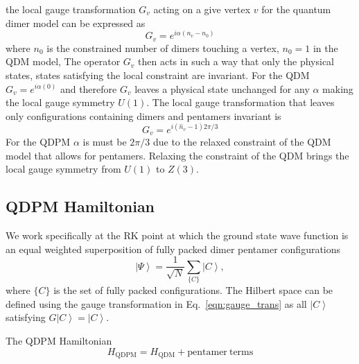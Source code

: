 \documentclass[twocolumn,prb,aps,floatfix,superscriptaddress]{revtex4-1}
\begin{document}
        the local gauge transformation $G_v$ acting on a give vertex $v$ for the quantum dimer model
        can be expressed as
        \begin{equation}
            \label{}
            G_v=e^{i \alpha (n_v - n_0)}
        \end{equation}
        where $n_0$ is the constrained number of dimers touching a vertex, $n_0=1$ in the QDM model,
        The operator $G_v$ then acts in such a
        way that only the physical states, states satisfying the local constraint 
        are invariant. For the QDM $G_v =
        e^{i\alpha (0)}$ and therefore $G_v$ leaves a physical state unchanged for any
        $\alpha$ making the local gauge symmetry $U(1)$. The local gauge transformation that leaves
        only configurations containing dimers and pentamers invariant is
        \begin{equation}
            \label{eqn:gauge_trans}
            G_v = e^{i (\hat{n}_v -1) 2\pi/3}    
        \end{equation}
        For the QDPM $\alpha$ is must be $2\pi/3$ due to the relaxed constraint of the QDM
        model that allows for pentamers. Relaxing the constraint of the QDM brings the local gauge
        symmetry from $U(1)$ to $Z(3)$.

    \subsection{QDPM Hamiltonian}

        We work specifically at the RK point at which the ground state wave function
        is an equal weighted superposition of fully packed dimer pentamer configurations
        \begin{equation}
            \label{}
            \left| \Psi \right\rangle = \frac{1}{\sqrt{N}}\sum_{\{C\}} \left| C \right\rangle
            ,
        \end{equation}
        where $\{C\}$ is the set of fully packed configurations. The Hilbert space can be defined
        using the gauge transformation in Eq.~\ref{eqn:gauge_trans} as all $\left| C \right\rangle$
        satisfying $G \left| C \right\rangle = \left| C \right\rangle$.

        The QDPM Hamiltonian
        \begin{equation}
            H_{\mathrm{QDPM}} = H_{\mathrm{QDM}} + \mathrm{pentamer\ terms}
        \end{equation}
\end{document}
